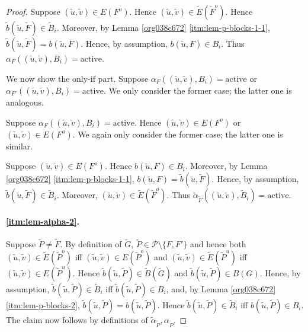 \documentclass[fontsize=11pt,paper=a4]{book}
\begin{document}
\begin{proof}
Suppose \((\tilde{u},\tilde{v})\in E(F^o)\).
Hence \((\tilde{u},\tilde{v})\in\tilde{E}(\tilde{F}^o)\).
Hence \(\tilde{b}(\tilde{u},\tilde{F})\in\tilde{B}_i\).
Moreover, by Lemma \ref{org038c672} \ref{itm:lem-p-blocks-1-1}, \(\tilde{b}(\tilde{u},\tilde{F})=b(\tilde{u},F)\).
Hence, by assumption, \(b(\tilde{u},F)\in B_i\).
Thus \(\alpha_F((\tilde{u},\tilde{v}),B_i)=\mathrm{active}\).

We now show the only-if part.
Suppose \(\alpha_F((\tilde{u},\tilde{v}),B_i)=\mathrm{active}\) or \(\alpha_{F'}((\tilde{u},\tilde{v}),B_i)=\mathrm{active}\).
We only consider the former case; the latter one is analogous.

Suppose \(\alpha_F((\tilde{u},\tilde{v}),B_i)=\mathrm{active}\).
Hence \((\tilde{u},\tilde{v})\in E(F^o)\) or \((\tilde{u},\tilde{v})\in E(F^u)\).
We again only consider the former case; the latter one is similar.

Suppose \((\tilde{u},\tilde{v})\in E(F^o)\).
Hence \(b(\tilde{u},F)\in B_i\).
Moreover, by Lemma \ref{org038c672} \ref{itm:lem-p-blocks-1-1}, \(b(\tilde{u},F)=\tilde{b}(\tilde{u},\tilde{F})\).
Hence, by assumption, \(\tilde{b}(\tilde{u},\tilde{F})\in\tilde{B}_i\).
Moreover, \((\tilde{u},\tilde{v})\in\tilde{E}(\tilde{F}^o)\).
Thus \(\tilde{\alpha}_{\tilde{F}}((\tilde{u},\tilde{v}),\tilde{B}_i)=\mathrm{active}\).

\paragraph{\ref{itm:lem-alpha-2}.}
Suppose \(\tilde{P}\neq\tilde{F}\).
By definition of \(\tilde{G}\), \(\tilde{P}\in\mathcal{P}\setminus\{F,F'\}\) and hence both \((\tilde{u},\tilde{v})\in\tilde{E}(\tilde{P}^o)\) iff \((\tilde{u},\tilde{v})\in E(\tilde{P}^o)\) and \((\tilde{u},\tilde{v})\in\tilde{E}(\tilde{P}^u)\) iff \((\tilde{u},\tilde{v})\in E(\tilde{P}^u)\).
Hence \(\tilde{b}(\tilde{u},\tilde{P})\in\tilde{B}(\tilde{G})\) and \(\tilde{b}(\tilde{u},\tilde{P})\in B(G)\).
Hence, by assumption, \(\tilde{b}(\tilde{u},\tilde{P})\in\tilde{B}_i\) iff \(\tilde{b}(\tilde{u},\tilde{P})\in B_i\), and, by Lemma \ref{org038c672} \ref{itm:lem-p-blocks-2}, \(\tilde{b}(\tilde{u},\tilde{P})=b(\tilde{u},\tilde{P})\).
Hence \(\tilde{b}(\tilde{u},\tilde{P})\in\tilde{B}_i\) iff \(b(\tilde{u},\tilde{P})\in B_i\).
The claim now follows by definitions of \(\tilde{\alpha}_{\tilde{P}},\alpha_{\tilde{P}}\).
\end{proof}
\end{document}
